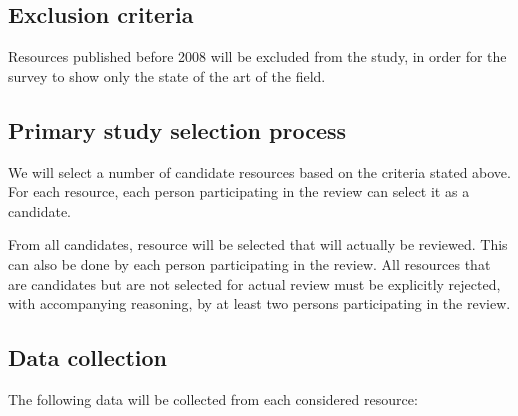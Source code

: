 \documentclass[]{book}
\begin{document}
\subsection{Exclusion criteria}\label{exclusion-criteria}

Resources published before 2008 will be excluded from the study, in
order for the survey to show only the state of the art of the field.

\subsection{Primary study selection
process}\label{primary-study-selection-process}

We will select a number of candidate resources based on the criteria
stated above. For each resource, each person participating in the review
can select it as a candidate.

From all candidates, resource will be selected that will actually be
reviewed. This can also be done by each person participating in the
review. All resources that are candidates but are not selected for
actual review must be explicitly rejected, with accompanying reasoning,
by at least two persons participating in the review.

\subsection{Data collection}\label{data-collection}

The following data will be collected from each considered resource:
\end{document}
